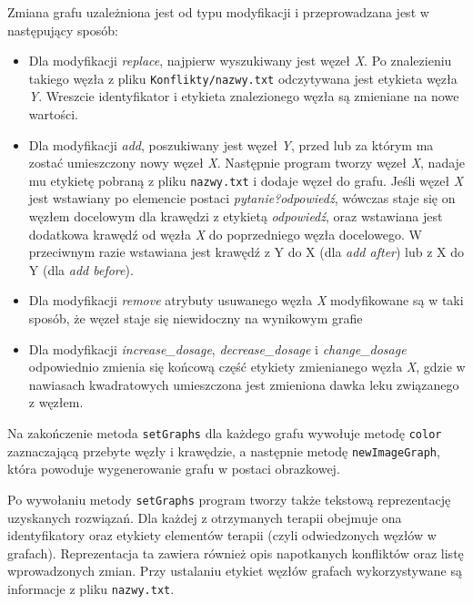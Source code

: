 Zmiana grafu uzależniona jest od typu modyfikacji i przeprowadzana jest w następujący sposób:
\begin{itemize}
\item Dla modyfikacji \textit{replace}, najpierw wyszukiwany jest węzeł \textit{X}. Po znalezieniu takiego węzła z pliku \texttt{Konflikty/nazwy.txt} odczytywana jest etykieta węzła \textit{Y}. Wreszcie identyfikator i etykieta znalezionego węzła są zmieniane na nowe wartości. 
\item Dla modyfikacji \textit{add}, poszukiwany jest węzeł \textit{Y}, przed lub za którym ma zostać umieszczony nowy węzeł \textit{X}. Następnie program tworzy węzeł \textit{X}, nadaje mu etykietę pobraną z pliku \texttt{nazwy.txt} i dodaje węzeł do grafu. Jeśli węzeł \textit{X} jest wstawiany po elemencie postaci \textit{pytanie?odpowiedź}, wówczas staje się on węzłem docelowym dla krawędzi z etykietą \textit{odpowiedź}, oraz wstawiana jest dodatkowa krawędź od węzła \textit{X} do poprzedniego węzła docelowego. 
W przeciwnym razie wstawiana jest krawędź z Y do X (dla \textit{add after}) lub z X do Y (dla \textit{add before}).
\item Dla modyfikacji \textit{remove} atrybuty usuwanego węzła \textit{X} modyfikowane są w taki sposób, że węzeł staje się niewidoczny na wynikowym grafie
\item Dla modyfikacji \textit{increase\_dosage}, \textit{decrease\_dosage} i \textit{change\_dosage} odpowiednio zmienia się końcową część etykiety zmienianego węzła \textit{X}, gdzie w nawiasach kwadratowych umieszczona jest zmieniona dawka leku związanego z węzłem. 

\end{itemize}

Na zakończenie metoda \texttt{setGraphs} dla każdego grafu wywołuje metodę \texttt{color} zaznaczającą przebyte węzły i krawędzie, a następnie metodę \texttt{newImageGraph}, która powoduje wygenerowanie grafu w postaci obrazkowej. 

Po wywołaniu metody \texttt{setGraphs} program tworzy także tekstową reprezentację uzyskanych rozwiązań. Dla każdej z otrzymanych terapii obejmuje ona identyfikatory oraz etykiety elementów terapii (czyli odwiedzonych węzłów w grafach). Reprezentacja ta zawiera również opis napotkanych konfliktów oraz listę wprowadzonych zmian. Przy ustalaniu etykiet węzłów grafach wykorzystywane są informacje z pliku \texttt{nazwy.txt}.


